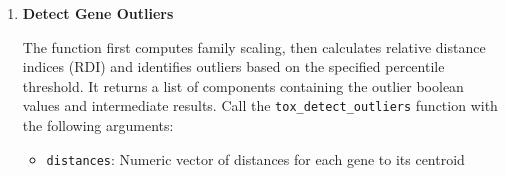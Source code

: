 \documentclass[11pt]{article}
\begin{document}
\begin{enumerate}
\begin{itemize}
	      	\item \texttt{d}: Gene expression matrix dimension as integer
	      \end{itemize}
	      \begin{lstlisting}[language=R, caption={R Distance to Centroid Calculation}]
tox_distance_to_centroid(genes, centroids, gene_to_fam, d)
	      \end{lstlisting}
	      
	      \begin{enumerate}
	      	\item \textbf{Calculate Euclidean Distance}
	      	      
	      	      Alternatively you can calculate a single Euclidean distance between two
	      	      vectors manually by calling \texttt{tox\_euclidean\_distance} function
	      	      with the following arguments:
	      	      
	      	      \begin{itemize}
	      	      	\item \texttt{vec1:} First vector
	      	      	      
	      	      	\item \texttt{vec2:} Second vector
	      	      \end{itemize}
	      	      
	      	      \textbf{Both vectors must have same length!}
	      	      
	      	      \begin{lstlisting}[language=R, caption={R Euclidean distance calculation}]
tox_euclidean_distance(vec1, vec2)
	      	      \end{lstlisting}
	      \end{enumerate}
	      
	\item \textbf{Detect Gene Outliers}
	      
	      The function first computes family scaling, then calculates relative
	      distance indices (RDI) and identifies outliers based on the specified
	      percentile threshold. It returns a list of components containing the outlier
	      boolean values and intermediate results. Call the \texttt{tox\_detect\_outliers}
	      function with the following arguments:
	      
	      \begin{itemize}
	      	\item \texttt{distances}: Numeric vector of distances for each gene to its
	      	      centroid
	      	      

\end{itemize}
\end{enumerate}
\end{document}
